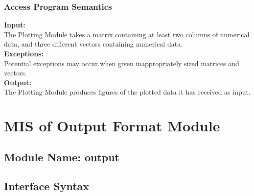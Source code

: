 \documentclass[12pt]{article}
\begin{document}
\subsubsection{Access Program Semantics}
\noindent \textbf{Input:}\\
The Plotting Module takes a matrix containing at least two columns of numerical
data, and three different vectors containing numerical data.\\

\noindent \textbf{Exceptions:}\\
Potential exceptions may occur when given inappropriately sized
matrices and vectors.\\

\noindent \textbf{Output:}\\
The Plotting Module produces figures of the plotted data it has received as input.



\section{MIS of Output Format Module}

\subsection{Module Name: output}





\subsection{Interface Syntax}
\end{document}
